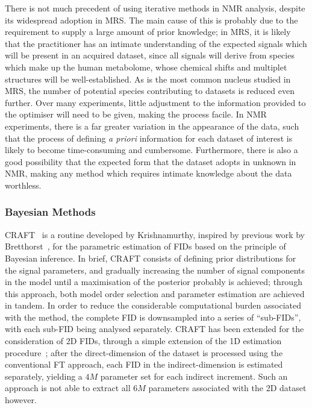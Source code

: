 There is not much precedent of using iterative methods in \ac{NMR} analysis,
despite its widespread adoption in \ac{MRS}. The main cause of this is probably due to
the requirement to supply a large amount of prior knowledge; in \ac{MRS}, it
is likely that the practitioner has an intimate understanding of the expected signals
which will be present in an acquired dataset, since all signals will derive
from species which make up the human metabolome, whose chemical shifts and multiplet
structures will be well-established. As  is the most
common nucleus studied in \ac{MRS}, the number of potential species
contributing to datasets is reduced even further. Over many experiments, little
adjustment to the information provided to the optimiser will need to be given,
making the process facile. In \ac{NMR} experiments, there is a far greater
variation in the appearance of the data, such that the process of defining
\textit{a priori} information for each dataset of interest is likely to become
time-consuming and cumbersome. Furthermore, there is also a good possibility
that the expected form that the dataset adopts in unknown in \ac{NMR}, making
any method which requires intimate knowledge about the data worthless.

\subsubsection{Bayesian Methods}
\Ac{CRAFT}~\cite{Krishnamurthy2013,Krishnamurthy2021} is a routine developed by
Krishnamurthy, inspired by previous work by
Bretthorst~\cite{Bretthorst1990a,Bretthorst1990b,Bretthorst1990c,Bretthorst1991,Bretthorst1992},
for the parametric estimation of \acp{FID} based on the principle of Bayesian
inference.
In brief, \ac{CRAFT} consists of defining prior distributions for the signal
parameters, and gradually increasing the number of signal components in the
model until a maximisation of the posterior probably is achieved; through this
approach, both model order selection and parameter estimation are achieved
in tandem. In order to reduce the considerable computational burden associated
with the method, the complete \ac{FID} is downsampled into a series of
``sub-\acp{FID}'', with each sub-\ac{FID} being analysed separately.
\ac{CRAFT} has been extended for the consideration of \ac{2D} \acp{FID},
through a simple extension of the \ac{1D} estimation
procedure~\cite{Krishnamurthy2017}; after the direct-dimension of the dataset is
processed using the conventional \ac{FT} approach, each \ac{FID} in the
indirect-dimension is estimated separately, yielding a $4M$ parameter
set for each indirect increment. Such an approach is not able to extract all
$6M$ parameters associated with the \ac{2D} dataset however.

